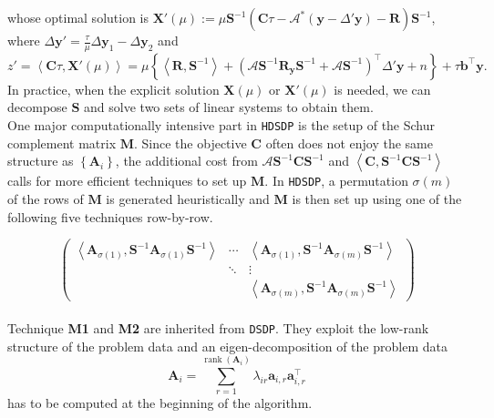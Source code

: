 \documentclass[10pt]{article}
\begin{document}
{whose optimal solution is $\mathbf{X}' (\mu) := \mu \mathbf{S}^{- 1} \left( \mathbf{C} \tau -
\mathcal{A}^{\ast} \left( \mathbf{y} - \Delta' \mathbf{y} \right) - \mathbf{R} \right) \mathbf{S}^{- 1}$, where
$\Delta \mathbf{y}' = \frac{\tau}{\mu} \Delta \mathbf{y}_1 - \Delta \mathbf{y}_2$ and
\[ z' = \left\langle \mathbf{C} \tau, \mathbf{X}' (\mu) \right\rangle = \mu \left\{
   \left\langle \mathbf{R}, \mathbf{S}^{- 1} \right\rangle + \left( \mathcal{A} \mathbf{S}^{- 1} \mathbf{R}_{\mathbf{y}}
   \mathbf{S}^{- 1} + \mathcal{A} \mathbf{S}^{- 1} \right)^{\top} \Delta' \mathbf{y} + n \right\} + \tau
   \mathbf{b}^{\top} \mathbf{y} . \]
In practice, when the explicit solution $\mathbf{X} (\mu)$ or $\mathbf{X}' (\mu)$ is needed,
we can decompose $\mathbf{S}$ and solve two sets of linear systems to obtain them.\\

One major computationally intensive part in {{\texttt{HDSDP}}} is the setup of
the Schur complement matrix $\mathbf{M}$. Since the objective $\mathbf{C}$ often does not
enjoy the same structure as $\left\{ \mathbf{A}_i \right\}$, the additional cost from
$\mathcal{A} \mathbf{S}^{- 1} \mathbf{C} \mathbf{S}^{- 1}$ and $\left\langle \mathbf{C}, \mathbf{S}^{- 1} \mathbf{C} \mathbf{S}^{- 1}
\right\rangle$ calls for more efficient techniques to set up $\mathbf{M}$. In
{{\texttt{HDSDP}}}, a permutation $\sigma (m)$ of the rows of $\mathbf{M}$ is
generated heuristically and $\mathbf{M}$ is then set up using one of the following five
techniques row-by-row.

\[ \left(\begin{array}{ccc}
     \left\langle \mathbf{A}_{\sigma (1)}, \mathbf{S}^{- 1} \mathbf{A}_{\sigma (1)} \mathbf{S}^{- 1}
     \right\rangle & \cdots & \left\langle \mathbf{A}_{\sigma (1)}, \mathbf{S}^{- 1}
     \mathbf{A}_{\sigma (m)} \mathbf{S}^{- 1} \right\rangle\\
     & \ddots & \vdots\\
     &  & \left\langle \mathbf{A}_{\sigma (m)}, \mathbf{S}^{- 1} \mathbf{A}_{\sigma (m)} \mathbf{S}^{- 1}
     \right\rangle
   \end{array}\right) \]\\
   
Technique {\textbf{M1}} and {\textbf{M2}} are inherited from
{{\texttt{DSDP}}}. They exploit the low-rank structure of the problem data and
an eigen-decomposition of the problem data
\[ \mathbf{A}_i = \sum_{r = 1}^{\ensuremath{\operatorname{rank}} \left( \mathbf{A}_i \right)} \lambda_{i r}
   \mathbf{a}_{i, r} \mathbf{a}^{\top}_{i, r} \]
has to be computed at the beginning of the algorithm.\\

}
\end{document}
